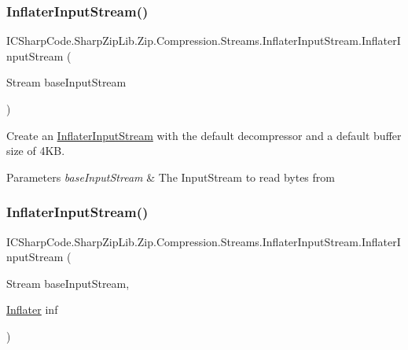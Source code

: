 \subsubsection{\texorpdfstring{Inflater\+Input\+Stream()}{InflaterInputStream()}\hspace{0.1cm}{\footnotesize\ttfamily [4/6]}}
{\footnotesize\ttfamily I\+C\+Sharp\+Code.\+Sharp\+Zip\+Lib.\+Zip.\+Compression.\+Streams.\+Inflater\+Input\+Stream.\+Inflater\+Input\+Stream (\begin{DoxyParamCaption}\item[{Stream}]{base\+Input\+Stream }\end{DoxyParamCaption})\hspace{0.3cm}{\ttfamily [inline]}}



Create an \hyperlink{class_i_c_sharp_code_1_1_sharp_zip_lib_1_1_zip_1_1_compression_1_1_streams_1_1_inflater_input_stream}{Inflater\+Input\+Stream} with the default decompressor and a default buffer size of 4\+KB. 


\begin{DoxyParams}{Parameters}
{\em base\+Input\+Stream} & The Input\+Stream to read bytes from \\
\hline
\end{DoxyParams}
\mbox{\label{class_i_c_sharp_code_1_1_sharp_zip_lib_1_1_zip_1_1_compression_1_1_streams_1_1_inflater_input_stream_a3be51c98d69f9420259ea0a2a081dcd1}} 
\subsubsection{\texorpdfstring{Inflater\+Input\+Stream()}{InflaterInputStream()}\hspace{0.1cm}{\footnotesize\ttfamily [5/6]}}
{\footnotesize\ttfamily I\+C\+Sharp\+Code.\+Sharp\+Zip\+Lib.\+Zip.\+Compression.\+Streams.\+Inflater\+Input\+Stream.\+Inflater\+Input\+Stream (\begin{DoxyParamCaption}\item[{Stream}]{base\+Input\+Stream,  }\item[{\hyperlink{class_i_c_sharp_code_1_1_sharp_zip_lib_1_1_zip_1_1_compression_1_1_inflater}{Inflater}}]{inf }\end{DoxyParamCaption})\hspace{0.3cm}{\ttfamily [inline]}}



